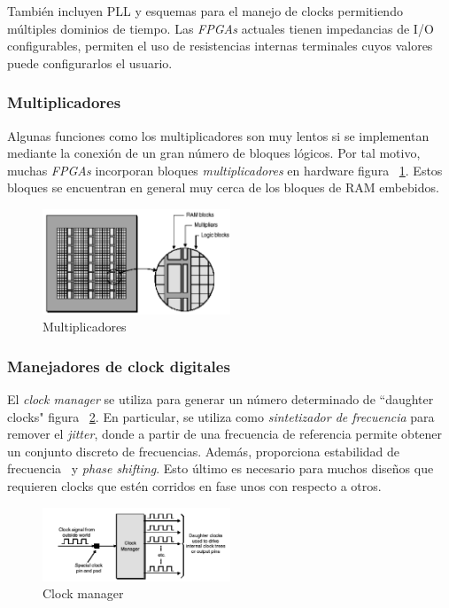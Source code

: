 También incluyen PLL y esquemas para el manejo de clocks permitiendo
múltiples dominios de tiempo. Las \textit{FPGAs} actuales tienen
impedancias de I/O configurables, permiten el uso de resistencias
internas terminales cuyos valores puede configurarlos el
usuario.

\subsubsection{Multiplicadores}

Algunas funciones como los multiplicadores son muy lentos si se
implementan mediante la conexión de un gran número de bloques
lógicos. Por tal motivo, muchas \textit{FPGAs} incorporan bloques
\textit{multiplicadores} en hardware figura ~\ref{fig:mult}. Estos
bloques se encuentran en general muy cerca de los bloques de RAM
embebidos.

\begin{figure}[h!]
\begin{center}
\includegraphics[width=0.5\textwidth,keepaspectratio=true]{./images/multram}
\caption{Multiplicadores}
\label{fig:mult}
\end{center}
\end{figure}

\subsubsection{Manejadores de clock digitales}

El \textit{clock manager} se utiliza para generar un número
determinado de “daughter clocks" figura ~\ref{fig:dclocks}. En
particular, se utiliza como \textit{sintetizador de frecuencia} para
remover el \textit{jitter}, donde a partir de una frecuencia de
referencia permite obtener un conjunto discreto de frecuencias. Además, proporciona estabilidad de frecuencia~\cite{Etiqueta03} y
\textit{phase shifting}. Esto último es necesario para muchos diseños que
requieren clocks que estén corridos en fase unos con respecto a otros.

\begin{figure}[h!]
\begin{center}
\includegraphics[width=0.5\textwidth,keepaspectratio=true]{./images/dougther}
\caption{Clock manager}
\label{fig:dclocks}
\end{center}
\end{figure}

